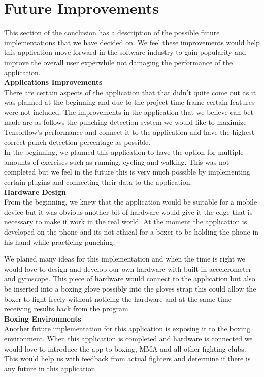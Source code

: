 \documentclass[a4paper,12pt]{report}
\begin{document}
\section{Future Improvements}
This section of the conclusion has a description of the possible future implementations that we have decided on. We feel these improvements would help this application move forward in the software industry to gain popularity and improve the overall user exper\bodyience while not damaging the performance of the application.\\

\textbf{Applications Improvements}\\
There are certain aspects of the application that that didn't quite come out as it was planned at the beginning and due to the project time frame certain features were not included.
The improvements in the application that we believe can bet made are as follows the punching detection system we would like to maximize Tensorflow's performance and connect it to the application and have the highest correct punch detection percentage as possible.\\
In the beginning, we planned this application to have the option for multiple amounts of exercises such as running, cycling and walking. This was not completed but we feel in the future this is very much possible by implementing certain plugins and connecting their data to the application.\\  


\textbf{Hardware Design}\\
From the beginning, we knew that the application would be suitable for a mobile device but it was obvious another bit of hardware would give it the edge that is necessary to make it work in the real world.
At the moment the application is developed on the phone and its not ethical for a boxer to be holding the phone in his hand while practicing punching.

We planed many ideas for this implementation and when the time is right we would love to design and develop our own hardware with built-in accelerometer and gyroscope.
This piece of hardware would connect to the application but also be inserted into a boxing glove possibly into the gloves strap this could allow the boxer to fight freely without noticing the hardware and at the same time receiving results back from the program.\\

\textbf{Boxing Environments}\\
Another future implementation for this application is exposing it to the boxing environment. When this application is completed and hardware is connected we would love to introduce the app to boxing, MMA and all other fighting clubs.
This would help us with feedback from actual fighters and determine if there is any future in this application.\\
\end{document}
